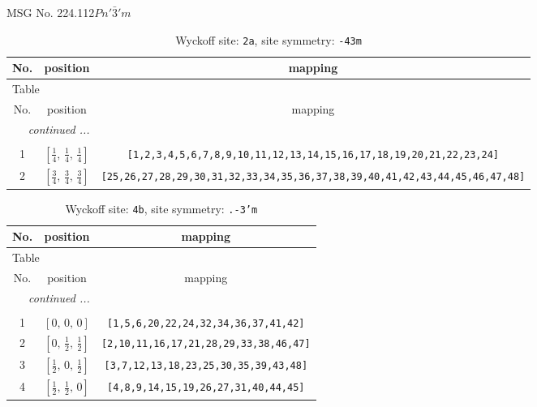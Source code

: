 \documentclass[fleqn,8pt]{jsarticle}
\begin{document}
\setcounter{MaxMatrixCols}{32}

\renewcommand{\tablename}{Table~}
\renewcommand{\figurename}{Figure~}
\begin{center}
\LARGE
MSG No. 224.112\quad$Pn'\bar{3}'m$
\end{center}
\renewcommand{\arraystretch}{1.2}
\begin{longtable}{ccc}
\caption{Wyckoff site: {\tt 2a}, site symmetry: {\tt -43m}}
 \\
 \hline \hline
No. & position & mapping \\ \hline \endfirsthead

\multicolumn{2}{l}{\tablename\ \thetable{}} \\
 \hline \hline
No. & position & mapping \\ \hline \endhead

 \hline \hline
\multicolumn{2}{r}{\footnotesize\it continued ...} \\ \endfoot

 \hline \hline
\multicolumn{2}{r}{} \\ \endlastfoot

1 & $\left[ \frac{1}{4},\, \frac{1}{4},\, \frac{1}{4} \right]$ & {\tt [1,2,3,4,5,6,7,8,9,10,11,12,13,14,15,16,17,18,19,20,21,22,23,24]} \\ \hline
2 & $\left[ \frac{3}{4},\, \frac{3}{4},\, \frac{3}{4} \right]$ & {\tt [25,26,27,28,29,30,31,32,33,34,35,36,37,38,39,40,41,42,43,44,45,46,47,48]} \\
\end{longtable}
\renewcommand{\arraystretch}{1.2}
\begin{longtable}{ccc}
\caption{Wyckoff site: {\tt 4b}, site symmetry: {\tt .-3'm}}
 \\
 \hline \hline
No. & position & mapping \\ \hline \endfirsthead

\multicolumn{2}{l}{\tablename\ \thetable{}} \\
 \hline \hline
No. & position & mapping \\ \hline \endhead

 \hline \hline
\multicolumn{2}{r}{\footnotesize\it continued ...} \\ \endfoot

 \hline \hline
\multicolumn{2}{r}{} \\ \endlastfoot

1 & $\left[ 0,\, 0,\, 0 \right]$ & {\tt [1,5,6,20,22,24,32,34,36,37,41,42]} \\ \hline
2 & $\left[ 0,\, \frac{1}{2},\, \frac{1}{2} \right]$ & {\tt [2,10,11,16,17,21,28,29,33,38,46,47]} \\ \hline
3 & $\left[ \frac{1}{2},\, 0,\, \frac{1}{2} \right]$ & {\tt [3,7,12,13,18,23,25,30,35,39,43,48]} \\ \hline
4 & $\left[ \frac{1}{2},\, \frac{1}{2},\, 0 \right]$ & {\tt [4,8,9,14,15,19,26,27,31,40,44,45]} \\
\end{longtable}
\end{document}
